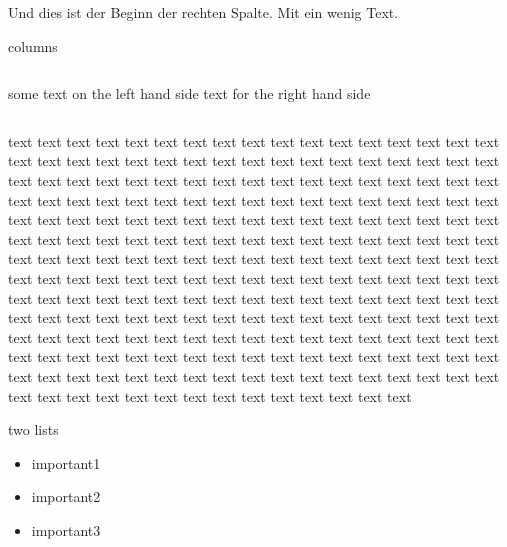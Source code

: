 \documentclass[final]{beamer} %
\begin{document}
\begin{frame}
  \begin{minipage}[t]{.49\textwidth}
Und dies ist der Beginn der rechten Spalte. Mit ein wenig Text.
    \begin{kasten}{\large columns}
      \begin{columns}
        \column{6cm}
          some text on the left hand side
        \column{4cm}
          text for the right hand side
      \end{columns}
    \end{kasten}
    \begin{kasten}{\large text}
      text text text text text text text text text text text text text 
			text text text text text text text text text text text text text 
			text text text text text text text text text text text text text 
			text text text text text text text text text text text text text 
			text text text text text text text text text text text text text 
			text text text text text text text text text text text text text 
			text text text text text text text text text text text text text 
			text text text text text text text text text text text text text 
			text text text text text text text text text text text text text 
			text text text text text text text text text text text text text 
			text text text text text text text text text text text text text 
			text text text text text text text text text text text text text 
			text text text text text text text text text text text text text 
			text text text text text text text text text text text text text 
			text text text text text text text text text text text text text 
			text text text text text text text text text text text text text 
			text text text text text text text text text text text text text 
			text text text text text text text text text text text text text 
    \end{kasten}
    \begin{kasten}{\large two lists}
      \begin{itemize}
        \item important1
        \item important2
        \item important3

\end{itemize}
\end{kasten}
\end{minipage}
\end{frame}
\end{document}
